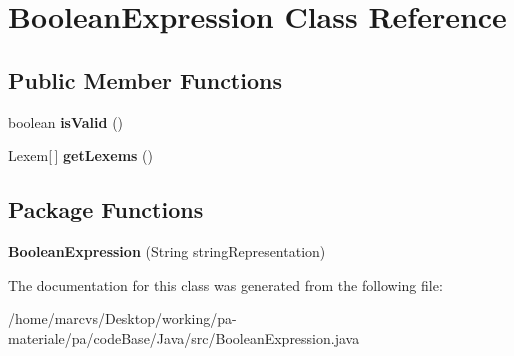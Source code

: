 \hypertarget{classBooleanExpression}{
\section{BooleanExpression Class Reference}
\label{classBooleanExpression}
}
\subsection*{Public Member Functions}
\begin{DoxyCompactItemize}
\item 
\hypertarget{classBooleanExpression_add76e02bf45058445aaf70fd6400108c}{
boolean {\bfseries isValid} ()}
\label{classBooleanExpression_add76e02bf45058445aaf70fd6400108c}

\item 
\hypertarget{classBooleanExpression_ae02cb61914b378cdd28cd858d9e8a4a0}{
Lexem\mbox{[}$\,$\mbox{]} {\bfseries getLexems} ()}
\label{classBooleanExpression_ae02cb61914b378cdd28cd858d9e8a4a0}

\end{DoxyCompactItemize}
\subsection*{Package Functions}
\begin{DoxyCompactItemize}
\item 
\hypertarget{classBooleanExpression_a0ac4c6f0eb4d1e9b96bd837aa31de159}{
{\bfseries BooleanExpression} (String stringRepresentation)}
\label{classBooleanExpression_a0ac4c6f0eb4d1e9b96bd837aa31de159}

\end{DoxyCompactItemize}


The documentation for this class was generated from the following file:\begin{DoxyCompactItemize}
\item 
/home/marcvs/Desktop/working/pa-\/materiale/pa/codeBase/Java/src/BooleanExpression.java\end{DoxyCompactItemize}
